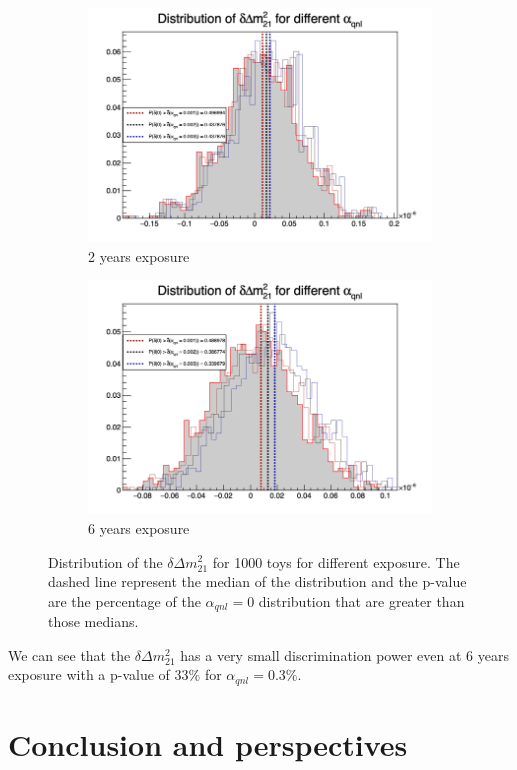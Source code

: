 \documentclass[../main.tex]{subfiles}
\begin{document}
\begin{figure}[th]
  \begin{subfigure}[t]{0.48\linewidth}
    \includegraphics[width=\linewidth]{images/joint_fit/stat_tests/chi2_delta_m_2y.png}
    \caption{2 years exposure}
  \end{subfigure}
  \begin{subfigure}[t]{0.48\linewidth}
    \includegraphics[width=\linewidth]{images/joint_fit/stat_tests/chi2_delta_m_6y.png}
    \caption{6 years exposure}
  \end{subfigure}
  \caption{Distribution of the $\delta \Delta m^2_{21}$ for 1000 toys for different exposure. The dashed line represent the median of the distribution and the p-value are the percentage of the $\alpha_{qnl} = 0$ distribution that are greater than those medians.}
  \label{fig:joint_fit:chi2_delta_m}
\end{figure}

We can see that the $\delta \Delta m^2_{21}$ has a very small discrimination power even at 6 years exposure with a p-value of 33\% for $\alpha_{qnl} = 0.3\%$.

%
%
%
%
%

\section{Conclusion and perspectives}
\label{sec:joint_fit:conclusion}
\end{document}
